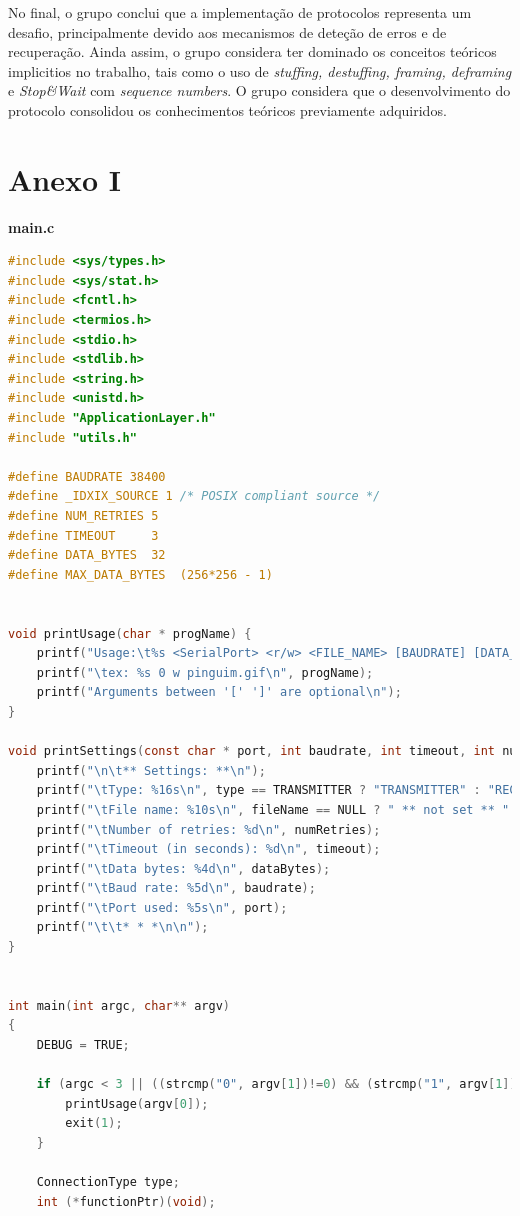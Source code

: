 \documentclass[a4paper, 11pt]{article}
\begin{document}
No final, o grupo conclui que a implementação de protocolos representa um desafio, principalmente devido aos mecanismos de deteção de erros e de recuperação. Ainda assim, o grupo considera ter dominado os conceitos teóricos implicitios no trabalho, tais como o uso de \textit{stuffing, destuffing, framing, deframing} e \textit{Stop\&Wait} com \textit{sequence numbers}. O grupo considera que o desenvolvimento do protocolo consolidou os conhecimentos teóricos previamente adquiridos.

\newpage

\section{Anexo I}

\huge\textbf{main.c}
\begin{lstlisting}[language=C]
#include <sys/types.h>
#include <sys/stat.h>
#include <fcntl.h>
#include <termios.h>
#include <stdio.h>
#include <stdlib.h>
#include <string.h>
#include <unistd.h>
#include "ApplicationLayer.h"
#include "utils.h"

#define BAUDRATE 38400
#define _IDXIX_SOURCE 1 /* POSIX compliant source */
#define NUM_RETRIES 5
#define TIMEOUT 	3
#define DATA_BYTES	32
#define MAX_DATA_BYTES	(256*256 - 1)


void printUsage(char * progName) {
	printf("Usage:\t%s <SerialPort> <r/w> <FILE_NAME> [BAUDRATE] [DATA_BYTES] [NUM_RETRIES] [TIMEOUT]\n", progName);
	printf("\tex: %s 0 w pinguim.gif\n", progName);
	printf("Arguments between '[' ']' are optional\n");
}

void printSettings(const char * port, int baudrate, int timeout, int numRetries, ConnectionType type, int dataBytes, const char * fileName) {
	printf("\n\t** Settings: **\n");
	printf("\tType: %16s\n", type == TRANSMITTER ? "TRANSMITTER" : "RECEIVER");
	printf("\tFile name: %10s\n", fileName == NULL ? " ** not set ** " : fileName);
	printf("\tNumber of retries: %d\n", numRetries);
	printf("\tTimeout (in seconds): %d\n", timeout);
	printf("\tData bytes: %4d\n", dataBytes);
	printf("\tBaud rate: %5d\n", baudrate);
	printf("\tPort used: %5s\n", port);
	printf("\t\t* * *\n\n");
}


int main(int argc, char** argv)
{
	DEBUG = TRUE;

	if (argc < 3 || ((strcmp("0", argv[1])!=0) && (strcmp("1", argv[1])!=0))) {
		printUsage(argv[0]);
		exit(1);
	}

	ConnectionType type;
	int (*functionPtr)(void);


\end{lstlisting}
\end{document}
